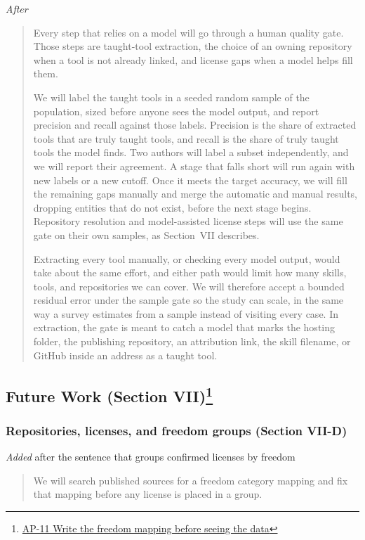 \noindent\textit{After}
\begin{quote}
Every step that relies on a model will go through a human quality gate.
Those steps are taught-tool extraction, the choice of an owning repository when a tool is not already linked, and license gaps when a model helps fill them.

We will label the taught tools in a seeded random sample of the population, sized before anyone sees the model output, and report precision and recall against those labels.
Precision is the share of extracted tools that are truly taught tools, and recall is the share of truly taught tools the model finds.
Two authors will label a subset independently, and we will report their agreement.
A stage that falls short will run again with new labels or a new cutoff.
Once it meets the target accuracy, we will fill the remaining gaps manually and merge the automatic and manual results, dropping entities that do not exist, before the next stage begins.
Repository resolution and model-assisted license steps will use the same gate on their own samples, as Section~VII describes.

Extracting every tool manually, or checking every model output, would take about the same effort, and either path would limit how many skills, tools, and repositories we can cover.
We will therefore accept a bounded residual error under the sample gate so the study can scale, in the same way a survey estimates from a sample instead of visiting every case.
In extraction, the gate is meant to catch a model that marks the hosting folder, the publishing repository, an attribution link, the skill filename, or GitHub inside an address as a taught tool.
\end{quote}

\subsection*{Future Work (Section VII)\footnote{\hyperref[ap:11]{AP-11 Write the freedom mapping before seeing the data}}}

\subsubsection*{Repositories, licenses, and freedom groups (Section VII-D)}

\textit{Added} after the sentence that groups confirmed licenses by freedom
\begin{quote}
We will search published sources for a freedom category mapping and fix that mapping before any license is placed in a group.
\end{quote}
